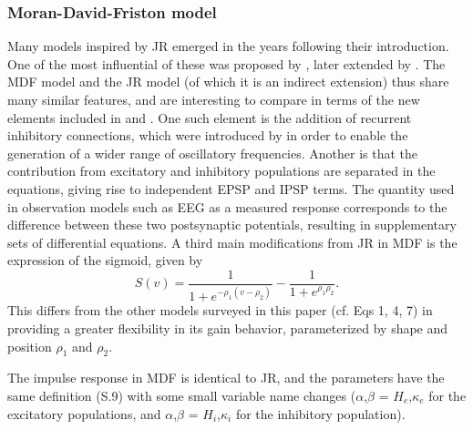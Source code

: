 \documentclass[12pt,twoside]{article}
\begin{document}
\subsubsection{Moran-David-Friston model}
Many models inspired by JR emerged in the years following their introduction. One of the most influential of these was proposed by \citet{david2003neural}, later extended by \citep{moran2007neural}. The MDF model and the JR model (of which it is an indirect extension) thus share many similar features, and are interesting to compare in terms of the new elements included in \citet{david2003neural} and \citet{moran2007neural}. One such element is the addition of recurrent inhibitory connections, which were introduced by \citet{moran2007neural} in order to enable the generation of a wider range of oscillatory frequencies. Another is that the contribution from excitatory and inhibitory populations are separated in the equations, giving rise to independent EPSP and IPSP terms. The quantity used in observation models such as EEG as a measured response corresponds to the difference between these two postsynaptic potentials, resulting in supplementary sets of differential equations. A third main modifications from JR in MDF is the expression of the sigmoid, given by  
\begin{equation}
    S(v)= \frac{1}{1+e^{-\rho_1 (v-\rho_2)}}- \frac{1}{1+e^{\rho_1 \rho_2 }} .
\end{equation}
This differs from the other models surveyed in this paper (cf. Eqs 1, 4, 7) in providing a greater flexibility in its gain behavior, parameterized by  shape and position $\rho_1$ and $\rho_2$. 

The impulse response in MDF is identical to JR, and the parameters have the same definition (S.9) with some small variable name changes ($\alpha$,$\beta$ = $H_e$,$\kappa_e$ for the excitatory populations, and $\alpha$,$\beta$ = $H_i$,$\kappa_i$ for the inhibitory population).
\end{document}
